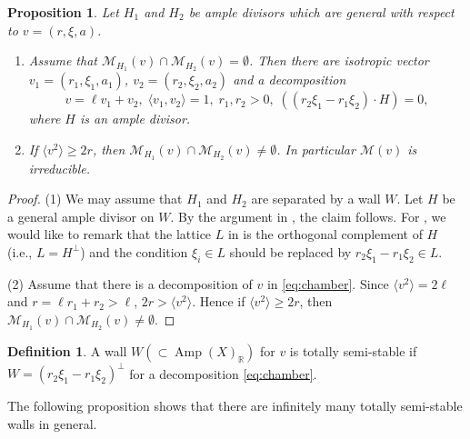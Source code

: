 \documentclass[10pt]{amsart}
\def\cal{\mathcal}
\def\Bbb{\mathbb}
\newcommand{\Amp}{\operatorname{Amp}}
\numberwithin{equation}{section}
\theoremstyle{plain}
\newtheorem{prop}[thm]{Proposition}
\theoremstyle{definition}
\newtheorem{defn}[thm]{Definition}
\theoremstyle{remark}
\begin{document}
\begin{prop}\label{prop:chamber}
Let $H_1$ and $H_2$ be ample divisors which are general with respect to $v=(r,\xi,a)$.
\begin{enumerate}
\item[(1)]
Assume that ${\cal M}_{H_1}(v) \cap {\cal M}_{H_2}(v)=\emptyset$.
Then there are isotropic vector $v_1=(r_1,\xi_1,a_1)$, $v_2=(r_2,\xi_2,a_2)$ and a decomposition
\begin{equation}\label{eq:chamber}
v=\ell v_1+v_2, \; \langle v_1,v_2 \rangle=1,\; r_1,r_2>0,\;
 ((r_2 \xi_1-r_1 \xi_2) \cdot H)=0, 
\end{equation}
where $H$ is an ample divisor. 
\item[(2)]
If $\langle v^2 \rangle \geq 2r$, then 
${\cal M}_{H_1}(v) \cap {\cal M}_{H_2}(v) \ne \emptyset$.
In particular ${\cal M}(v)$ is irreducible.
\end{enumerate}
\end{prop}

\begin{proof}
(1)
We may assume that $H_1$ and $H_2$ are separated by a wall $W$. 
Let $H$ be a general ample divisor on $W$.
By the argument in \cite[3.3]{KY}, the claim follows. 
For \cite[Lem. 3.9]{KY}, we would like to remark that
the lattice $L$ in \cite[Lem. 3.9]{KY} is the orthogonal complement of $H$
(i.e., $L=H^\perp$) and the condition $\xi_i \in L$ should be replaced by
$r_2 \xi_1-r_1 \xi_2 \in L$.

(2)
Assume that there is a decomposition of $v$ in \eqref{eq:chamber}.
Since $\langle v^2 \rangle=2\ell$ and
$r=\ell r_1+r_2>\ell$,
$2r>\langle v^2 \rangle$.
Hence if $\langle v^2 \rangle \geq 2r$, then 
${\cal M}_{H_1}(v) \cap {\cal M}_{H_2}(v) \ne \emptyset$.
\end{proof}

\begin{defn}
A wall $W (\subset \Amp(X)_{\Bbb R})$ for $v$ is totally semi-stable if
$W=(r_2 \xi_1-r_1 \xi_2)^\perp$ for a decomposition \eqref{eq:chamber}. 
\end{defn}

The following proposition shows that there are infinitely many totally semi-stable walls in general.
\end{document}
